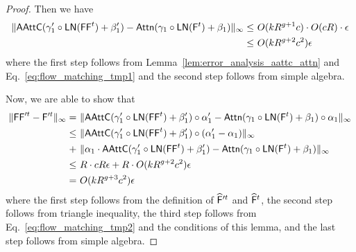 \begin{proof}
    Then we have
    \begin{align}\label{eq:flow_matching_tmp2}
        \| \mathsf{AAttC}(\gamma'_1 \circ \mathsf{LN}(\mathsf{FF}^t) + \beta'_1) -\mathsf{Attn}(\gamma_1 \circ \mathsf{LN}(\mathsf{F}^t) + \beta_1)\|_\infty \leq&~ O(k R^{g+1} c) \cdot O(cR) \cdot \epsilon \notag\\
        \leq&~ O(kR^{g+2} c^2) \epsilon
    \end{align}
    where the first step follows from Lemma~\ref{lem:error_analysis_aattc_attn} and Eq.~\eqref{eq:flow_matching_tmp1} and the second step follows from simple algebra.

    Now, we are able to show that
    \begin{align}\label{eq:error_analysis_tmp3}
        \| \mathsf{FF}'^t -  \mathsf{F}'^t\|_\infty =&~ \|\mathsf{AAttC}(\gamma'_1 \circ \mathsf{LN}(\mathsf{FF}^t)+\beta'_1) \circ \alpha'_1 -  \mathsf{Attn}(\gamma_1 \circ \mathsf{LN}(\mathsf{F}^t)+\beta_1) \circ \alpha_1\|_\infty\notag \\
        \leq&~ \| \mathsf{AAttC}(\gamma'_1 \circ \mathsf{LN}(\mathsf{FF}^t)+\beta'_1) \circ (\alpha'_1-\alpha_1)\|_\infty \notag \\+&~ \|\alpha_1 \cdot \mathsf{AAttC}(\gamma'_1 \circ \mathsf{LN}(\mathsf{FF}^t) + \beta'_1) -\mathsf{Attn}(\gamma_1 \circ \mathsf{LN}(\mathsf{F}^t) + \beta_1) \|_\infty\notag \\
        \leq&~ R \cdot cR\epsilon + R \cdot O(kR^{g+2}c^2) \epsilon\notag \\
        =&~   O(kR^{g+3}c^2) \epsilon
    \end{align}
    where the first step follows from the definition of $\widehat{\mathsf{F}}'^t$ and $\widehat{\mathsf{F}}^t$, the second step follows from triangle inequality, the third step follows from Eq.~\eqref{eq:flow_matching_tmp2} and the conditions of this lemma, and the last step follows from simple algebra.


\end{proof}
